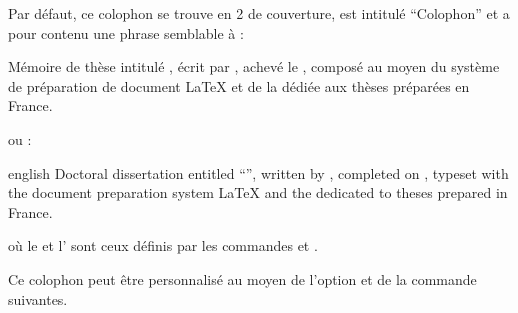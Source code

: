 Par défaut, ce colophon se trouve en 2\ieme{} de couverture, est intitulé
\enquote{Colophon} et a pour contenu une phrase semblable à\selonlangue{} :
\begin{displayquote}
  Mémoire de thèse intitulé , écrit par ,
  achevé le , composé au moyen du système
  de préparation de document \LaTeX{} et de la \yatCl{} dédiée aux thèses
  préparées en France.
\end{displayquote}
ou :
\begin{foreigndisplayquote}{english}
  Doctoral dissertation entitled “”, written by ,
  completed on , typeset with the document
  preparation system \LaTeX{} and the \yatCl{} dedicated to theses prepared in
  France.
\end{foreigndisplayquote}
où le  et l' sont ceux définis par les commandes
 et .

Ce colophon peut être personnalisé au moyen de l'option
 et de la commande  suivantes.

